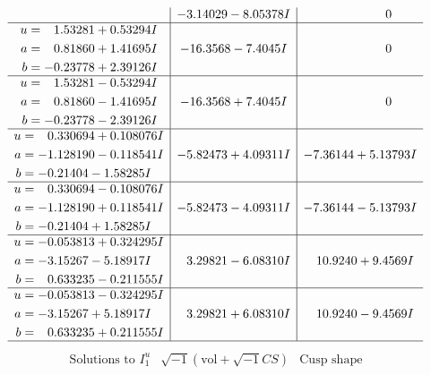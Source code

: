 \documentclass[1p]{elsarticle_modified}
\theoremstyle{definition}
\newcommand{\I}{\sqrt{-1}}
\begin{document}
$$\begin{array}{c|c|c}
 & -3.14029 - 8.05378 I & \phantom{-0.000000 } 0 \\ \hline\begin{aligned}
u &= \phantom{-}1.53281 + 0.53294 I \\
a &= \phantom{-}0.81860 + 1.41695 I \\
b &= -0.23778 + 2.39126 I\end{aligned}
 & -16.3568 - 7.4045 I & \phantom{-0.000000 } 0 \\ \hline\begin{aligned}
u &= \phantom{-}1.53281 - 0.53294 I \\
a &= \phantom{-}0.81860 - 1.41695 I \\
b &= -0.23778 - 2.39126 I\end{aligned}
 & -16.3568 + 7.4045 I & \phantom{-0.000000 } 0 \\ \hline\begin{aligned}
u &= \phantom{-}0.330694 + 0.108076 I \\
a &= -1.128190 - 0.118541 I \\
b &= -0.21404 - 1.58285 I\end{aligned}
 & -5.82473 + 4.09311 I & -7.36144 + 5.13793 I \\ \hline\begin{aligned}
u &= \phantom{-}0.330694 - 0.108076 I \\
a &= -1.128190 + 0.118541 I \\
b &= -0.21404 + 1.58285 I\end{aligned}
 & -5.82473 - 4.09311 I & -7.36144 - 5.13793 I \\ \hline\begin{aligned}
u &= -0.053813 + 0.324295 I \\
a &= -3.15267 - 5.18917 I \\
b &= \phantom{-}0.633235 - 0.211555 I\end{aligned}
 & \phantom{-}3.29821 - 6.08310 I & \phantom{-}10.9240 + 9.4569 I \\ \hline\begin{aligned}
u &= -0.053813 - 0.324295 I \\
a &= -3.15267 + 5.18917 I \\
b &= \phantom{-}0.633235 + 0.211555 I\end{aligned}
 & \phantom{-}3.29821 + 6.08310 I & \phantom{-}10.9240 - 9.4569 I\\
 \hline 
 \end{array}$$\newpage$$\begin{array}{c|c|c}  
\text{Solutions to }I^u_{1}& \I (\text{vol} + \sqrt{-1}CS) & \text{Cusp shape}\\

\end{array}$$
\end{document}
